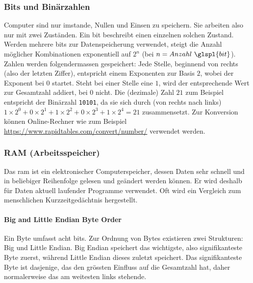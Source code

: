 \documentclass[11pt, a4paper]{article}
\begin{document}
\subsubsection{Bits und Binärzahlen}
Computer sind nur imstande, Nullen und Einsen zu speichern. Sie arbeiten also nur mit zwei Zuständen. Ein \gls{bit} beschreibt einen einzelnen solchen Zustand. Werden mehrere \glspl{bit} zur Datenspeicherung verwendet, steigt die Anzahl möglicher Kombinationen exponentiell auf \( 2^n \) (bei \(n = Anzahl~\glspl{bit}\)). Zahlen werden folgendermassen gespeichert: Jede Stelle, beginnend von rechts (also der letzten Ziffer), entspricht einem Exponenten zur Basis \(2\), wobei der Exponent bei \(0\) startet. Steht bei einer Stelle eine \(1\), wird der entsprechende Wert zur Gesamtzahl addiert, bei \(0\) nicht. Die (dezimale) Zahl \(21\) zum Beispiel entspricht der Binärzahl \texttt{10101}, da sie sich durch (von rechts nach links) \(1 \times 2^0 + 0 \times 2^1 + 1 \times 2^2 + 0 \times 2^3 + 1 \times 2^4 = 21\) zusammensetzt. Zur Konversion können Online-Rechner wie zum Beispiel \url{https://www.rapidtables.com/convert/number/} verwendet werden.

\subsubsection{RAM (Arbeitsspeicher)}
Das \gls{ram} ist ein elektronischer Computerspeicher, dessen Daten sehr schnell und in beliebiger Reihenfolge gelesen und geändert werden können. Er wird deshalb für Daten aktuell laufender Programme verwendet. Oft wird ein Vergleich zum menschlichen Kurzzeitgedächtnis hergestellt. 

\paragraph{Big and Little Endian Byte Order}
Ein Byte umfasst acht \glspl{bit}. Zur Ordnung von Bytes existieren zwei Strukturen: Big und Little Endian. Big Endian speichert das wichtigste, also signifikanteste Byte zuerst, während Little Endian dieses zuletzt speichert. Das signifikanteste Byte ist dasjenige, das den grössten Einfluss auf die Gesamtzahl hat, daher normalerweise das am weitesten links stehende.
\end{document}
